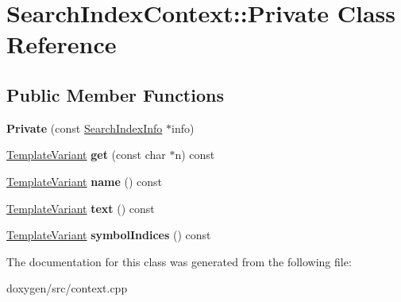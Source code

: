 \hypertarget{class_search_index_context_1_1_private}{}\section{Search\+Index\+Context\+::Private Class Reference}
\label{class_search_index_context_1_1_private}
\subsection*{Public Member Functions}
\begin{DoxyCompactItemize}
\item 
\mbox{\label{class_search_index_context_1_1_private_adf37576ee20b5fc40a60b0dd93bd3ff6}} 
{\bfseries Private} (const \mbox{\hyperlink{struct_search_index_info}{Search\+Index\+Info}} $\ast$info)
\item 
\mbox{\label{class_search_index_context_1_1_private_af9369537f367e83d1cf6005dfdeb926f}} 
\mbox{\hyperlink{class_template_variant}{Template\+Variant}} {\bfseries get} (const char $\ast$n) const
\item 
\mbox{\label{class_search_index_context_1_1_private_a18962ac4bffeca10e3c39c3fe00f5bb7}} 
\mbox{\hyperlink{class_template_variant}{Template\+Variant}} {\bfseries name} () const
\item 
\mbox{\label{class_search_index_context_1_1_private_a9cd3779f2efb0990d3b3eb3353c66def}} 
\mbox{\hyperlink{class_template_variant}{Template\+Variant}} {\bfseries text} () const
\item 
\mbox{\label{class_search_index_context_1_1_private_aa7b96daec5f7d3a921445b66f8227a0a}} 
\mbox{\hyperlink{class_template_variant}{Template\+Variant}} {\bfseries symbol\+Indices} () const
\end{DoxyCompactItemize}


The documentation for this class was generated from the following file\+:\begin{DoxyCompactItemize}
\item 
doxygen/src/context.\+cpp\end{DoxyCompactItemize}
